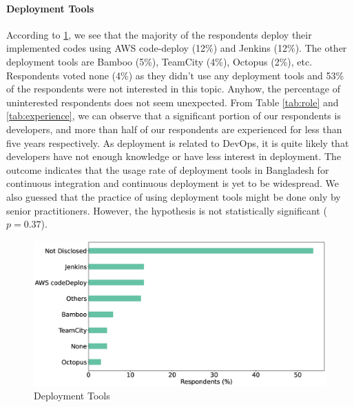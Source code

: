 \paragraph{Deployment Tools}
According to \ref{fig:deployTools}, we see that the majority of the respondents deploy their implemented codes using AWS code-deploy (12\%) and Jenkins (12\%). The other deployment tools are Bamboo (5\%), TeamCity (4\%), Octopus (2\%), etc. Respondents voted none (4\%) as they didn't use any deployment tools and 53\% of the respondents were not interested in this topic. Anyhow, the percentage of uninterested respondents does not seem unexpected. From Table \ref{tab:role} and \ref{tab:experience}, we can observe that a significant portion of our respondents is developers, and more than half of our respondents are experienced for less than five years respectively. As deployment is related to DevOps, it is quite likely that developers have not enough knowledge or have less interest in deployment.   The outcome indicates that the usage rate of deployment tools in Bangladesh for continuous integration and continuous deployment is yet to be widespread. We also guessed that the practice of using deployment tools might be done only by senior practitioners. However, the hypothesis is not statistically significant ($p=0.37$).


\begin{figure}[h]
\centering
  \includegraphics[scale=0.18]{Figures/Respondents_deployment_tools}
  \caption{Deployment Tools}
  \label{fig:deployTools}
\end{figure}


